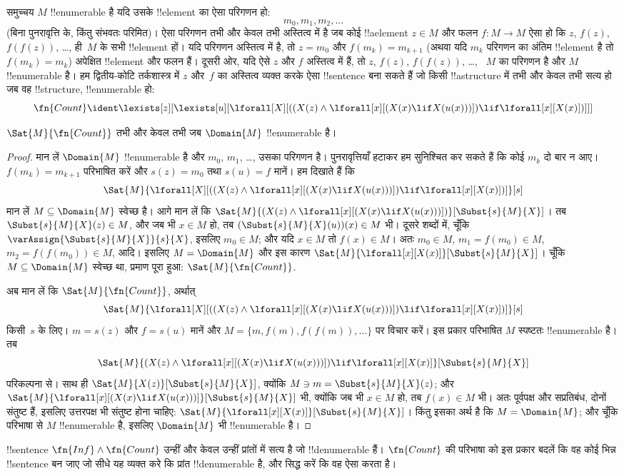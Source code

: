 \documentclass[../../../include/open-logic-section]{subfiles}
\begin{document}
समुच्चय $M$ !!{enumerable} है यदि उसके !!{element} का ऐसा परिगणन हो:
\[
m_0, m_1, m_2, \dots
\]
(बिना पुनरावृत्ति के, किंतु संभवतः परिमित)। ऐसा परिगणन तभी और केवल तभी
अस्तित्व में है जब कोई !!a{element} $z \in M$ और फलन $f\colon M \to M$ ऐसा
हो कि $z$, $f(z)$, $f(f(z))$, \dots, ही~$M$ के सभी !!{element} हों। यदि
परिगणन अस्तित्व में है, तो $z = m_0$ और $f(m_k) = m_{k+1}$ (अथवा यदि $m_k$
परिगणन का अंतिम !!{element} है तो $f(m_k) = m_k$) अपेक्षित !!{element} और
फलन हैं। दूसरी ओर, यदि ऐसे $z$ और $f$ अस्तित्व में हैं, तो $z$, $f(z)$,
$f(f(z))$, \dots, ~$M$ का परिगणन है और $M$ !!{enumerable} है। हम
द्वितीय-कोटि तर्कशास्त्र में $z$ और~$f$ का अस्तित्व व्यक्त करके ऐसा
!!{sentence} बना सकते हैं जो किसी !!a{structure} में तभी और केवल तभी सत्य
हो जब वह !!{structure}, !!{enumerable} हो:
\[
\fn{Count} \ident
\lexists[z][\lexists[u][\lforall[X][((X(z) \land
      \lforall[x][(X(x) \lif X(u(x)))]) \lif \lforall[x][X(x)])]]]
\]

\begin{prop}
$\Sat{M}{\fn{Count}}$ तभी और केवल तभी जब $\Domain{M}$ !!{enumerable} है।
\end{prop}

\begin{proof}
मान लें $\Domain{M}$ !!{enumerable} है और $m_0$, $m_1$, \dots, उसका
परिगणन है। पुनरावृत्तियाँ हटाकर हम सुनिश्चित कर सकते हैं कि कोई $m_k$ दो
बार न आए। $f(m_k) = m_{k+1}$ परिभाषित करें और $s(z) = m_0$ तथा $s(u) = f$
मानें। हम दिखाते हैं कि
\[
\Sat{M}{\lforall[X][((X(z) \land \lforall[x][(X(x) \lif X(u(x)))])
    \lif \lforall[x][X(x)])]}[s]
\]
मान लें $M \subseteq \Domain{M}$ स्वेच्छ है। आगे मान लें कि
$\Sat{M}{(X(z) \land \lforall[x][(X(x) \lif
X(u(x)))])}[\Subst{s}{M}{X}]$। तब $\Subst{s}{M}{X}(z) \in M$, और जब भी
$x \in M$ हो, तब $(\Subst{s}{M}{X}(u))(x) \in M$ भी। दूसरे शब्दों में,
चूँकि $\varAssign{\Subst{s}{M}{X}}{s}{X}$, इसलिए $m_0 \in M$; और यदि
$x \in M$ तो $f(x) \in M$। अतः $m_0 \in M$, $m_1 = f(m_0) \in M$,
$m_2 = f(f(m_0)) \in M$, आदि। इसलिए $M = \Domain{M}$ और इस कारण
$\Sat{M}{\lforall[x][X(x)]}[\Subst{s}{M}{X}]$। चूँकि $M \subseteq
\Domain{M}$ स्वेच्छ था, प्रमाण पूरा हुआ:
$\Sat{M}{\fn{Count}}$.

अब मान लें कि $\Sat{M}{\fn{Count}}$, अर्थात्
\[
\Sat{M}{\lforall[X][((X(z) \land \lforall[x][(X(x) \lif X(u(x)))])
    \lif \lforall[x][X(x)])]}[s]
\]
किसी~$s$ के लिए। $m = s(z)$ और $f = s(u)$ मानें और $M = \{m, f(m),
f(f(m)), \dots\}$ पर विचार करें। इस प्रकार परिभाषित $M$ स्पष्टतः
!!{enumerable} है। तब
\[
\Sat{M}{(X(z) \land \lforall[x][(X(x) \lif X(u(x)))])
    \lif \lforall[x][X(x)]}[\Subst{s}{M}{X}]
\]
परिकल्पना से। साथ ही $\Sat{M}{X(z)}[\Subst{s}{M}{X}]$, क्योंकि $M \ni m =
\Subst{s}{M}{X}(z)$; और $\Sat{M}{\lforall[x][(X(x) \lif
X(u(x)))]}[\Subst{s}{M}{X}]$ भी, क्योंकि जब भी $x \in M$ हो, तब
$f(x) \in M$ भी। अतः पूर्वपक्ष और सप्रतिबंध, दोनों संतुष्ट हैं, इसलिए
उत्तरपक्ष भी संतुष्ट होना चाहिए:
$\Sat{M}{\lforall[x][X(x)]}[\Subst{s}{M}{X}]$। किंतु इसका अर्थ है कि
$M = \Domain{M}$; और चूँकि परिभाषा से $M$ !!{enumerable} है, इसलिए
$\Domain{M}$ भी !!{enumerable} है।
\end{proof}

\begin{prob}
!!{sentence} $\fn{Inf} \land \fn{Count}$ उन्हीं और केवल उन्हीं प्रांतों में
सत्य है जो !!{denumerable} हैं। $\fn{Count}$ की परिभाषा को इस प्रकार बदलें
कि वह कोई भिन्न !!{sentence} बन जाए जो सीधे यह व्यक्त करे कि प्रांत
!!{denumerable} है, और सिद्ध करें कि वह ऐसा करता है।
\end{prob}
\end{document}
